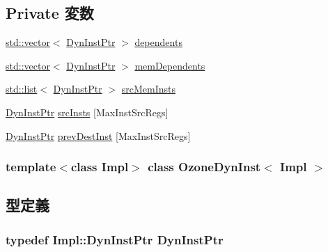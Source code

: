 \subsection*{Private 変数}
\begin{DoxyCompactItemize}
\item 
\hyperlink{classstd_1_1vector}{std::vector}$<$ \hyperlink{classOzoneDynInst_a028ce10889c5f6450239d9e9a7347976}{DynInstPtr} $>$ \hyperlink{classOzoneDynInst_a99b3ba0948715cdad5da539fcb59a9f6}{dependents}
\item 
\hyperlink{classstd_1_1vector}{std::vector}$<$ \hyperlink{classOzoneDynInst_a028ce10889c5f6450239d9e9a7347976}{DynInstPtr} $>$ \hyperlink{classOzoneDynInst_a5bb0000180ac8f071b922398c3ac227e}{memDependents}
\item 
\hyperlink{classstd_1_1list}{std::list}$<$ \hyperlink{classOzoneDynInst_a028ce10889c5f6450239d9e9a7347976}{DynInstPtr} $>$ \hyperlink{classOzoneDynInst_a13a831a5d0ecbe3db725fc446901268d}{srcMemInsts}
\item 
\hyperlink{classOzoneDynInst_a028ce10889c5f6450239d9e9a7347976}{DynInstPtr} \hyperlink{classOzoneDynInst_a1b1532e26249ee7c2b50fd8e23341bf1}{srcInsts} \mbox{[}MaxInstSrcRegs\mbox{]}
\item 
\hyperlink{classOzoneDynInst_a028ce10889c5f6450239d9e9a7347976}{DynInstPtr} \hyperlink{classOzoneDynInst_afa9f5b8c5f070a82383ea9720a61b968}{prevDestInst} \mbox{[}MaxInstSrcRegs\mbox{]}
\end{DoxyCompactItemize}
\subsubsection*{template$<$class Impl$>$ class OzoneDynInst$<$ Impl $>$}



\subsection{型定義}
\hypertarget{classOzoneDynInst_a028ce10889c5f6450239d9e9a7347976}{
\subsubsection[{DynInstPtr}]{\setlength{\rightskip}{0pt plus 5cm}typedef Impl::DynInstPtr {\bf DynInstPtr}}}
\label{classOzoneDynInst_a028ce10889c5f6450239d9e9a7347976}


